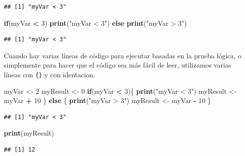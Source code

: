 \documentclass[
]{book}
\newenvironment{Shaded}{\begin{snugshade}}{\end{snugshade}}
\newcommand{\ControlFlowTok}[1]{\textcolor[rgb]{0.13,0.29,0.53}{\textbf{#1}}}
\newcommand{\DecValTok}[1]{\textcolor[rgb]{0.00,0.00,0.81}{#1}}
\newcommand{\KeywordTok}[1]{\textcolor[rgb]{0.13,0.29,0.53}{\textbf{#1}}}
\newcommand{\NormalTok}[1]{#1}
\newcommand{\OperatorTok}[1]{\textcolor[rgb]{0.81,0.36,0.00}{\textbf{#1}}}
\newcommand{\StringTok}[1]{\textcolor[rgb]{0.31,0.60,0.02}{#1}}
\begin{document}
\begin{verbatim}
## [1] "myVar < 3"
\end{verbatim}

\begin{Shaded}
\begin{Highlighting}[]
\ControlFlowTok{if}\NormalTok{(myVar }\OperatorTok{<}\StringTok{ }\DecValTok{3}\NormalTok{) }\KeywordTok{print}\NormalTok{(}\StringTok{"myVar < 3"}\NormalTok{) }\ControlFlowTok{else} \KeywordTok{print}\NormalTok{(}\StringTok{"myVar > 3"}\NormalTok{)}
\end{Highlighting}
\end{Shaded}

\begin{verbatim}
## [1] "myVar < 3"
\end{verbatim}

Cuando hay varias líneas de código para ejecutar basadas en la prueba lógica, o simplemente para hacer que el código sea más fácil de leer, utilizamos varias líneas con \texttt{\{\}} y con identacion.

\begin{Shaded}
\begin{Highlighting}[]
\NormalTok{myVar <-}\StringTok{ }\DecValTok{2}
\NormalTok{myResult <-}\StringTok{ }\DecValTok{0}
\ControlFlowTok{if}\NormalTok{(myVar }\OperatorTok{<}\StringTok{ }\DecValTok{3}\NormalTok{)\{}
  \KeywordTok{print}\NormalTok{(}\StringTok{"myVar < 3"}\NormalTok{)}
\NormalTok{  myResult <-}\StringTok{ }\NormalTok{myVar }\OperatorTok{+}\StringTok{ }\DecValTok{10}
\NormalTok{\} }\ControlFlowTok{else}\NormalTok{ \{}
  \KeywordTok{print}\NormalTok{(}\StringTok{"myVar > 3"}\NormalTok{)}
\NormalTok{  myResult <-}\StringTok{ }\NormalTok{myVar }\OperatorTok{-}\StringTok{ }\DecValTok{10}
\NormalTok{\}}
\end{Highlighting}
\end{Shaded}

\begin{verbatim}
## [1] "myVar < 3"
\end{verbatim}

\begin{Shaded}
\begin{Highlighting}[]
\KeywordTok{print}\NormalTok{(myResult)}
\end{Highlighting}
\end{Shaded}

\begin{verbatim}
## [1] 12
\end{verbatim}
\end{document}

